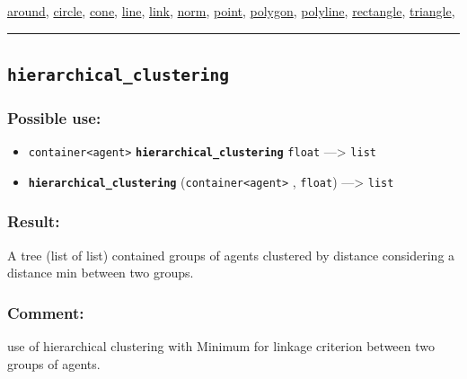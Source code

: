 \documentclass[]{book}
\providecommand{\tightlist}{%
  \setlength{\itemsep}{0pt}\setlength{\parskip}{0pt}}
\theoremstyle{definition}
\theoremstyle{definition}
\theoremstyle{definition}
\theoremstyle{remark}
\begin{document}
\href{operators-a-to-a.html\#around}{around},
\href{operators-b-to-c.html\#circle}{circle},
\href{operators-b-to-c.html\#cone}{cone},
\href{operators-i-to-m.html\#line}{line},
\href{operators-i-to-m.html\#link}{link},
\href{operators-n-to-r.html\#norm}{norm},
\href{operators-n-to-r.html\#point}{point},
\href{operators-n-to-r.html\#polygon}{polygon},
\href{operators-n-to-r.html\#polyline}{polyline},
\href{operators-n-to-r.html\#rectangle}{rectangle},
\href{operators-s-to-z.html\#triangle}{triangle},

\begin{center}\rule{0.5\linewidth}{\linethickness}\end{center}

\subsection{\texorpdfstring{\texttt{hierarchical\_clustering}}{hierarchical\_clustering}}\label{hierarchical_clustering}

\subsubsection{Possible use:}\label{possible-use-259}

\begin{itemize}
\tightlist
\item
  \texttt{container\textless{}agent\textgreater{}}
  \textbf{\texttt{hierarchical\_clustering}} \texttt{float}
  ---\textgreater{} \texttt{list}
\item
  \textbf{\texttt{hierarchical\_clustering}}
  (\texttt{container\textless{}agent\textgreater{}} , \texttt{float})
  ---\textgreater{} \texttt{list}
\end{itemize}

\subsubsection{Result:}\label{result-250}

A tree (list of list) contained groups of agents clustered by distance
considering a distance min between two groups.

\subsubsection{Comment:}\label{comment-49}

use of hierarchical clustering with Minimum for linkage criterion
between two groups of agents.
\end{document}
